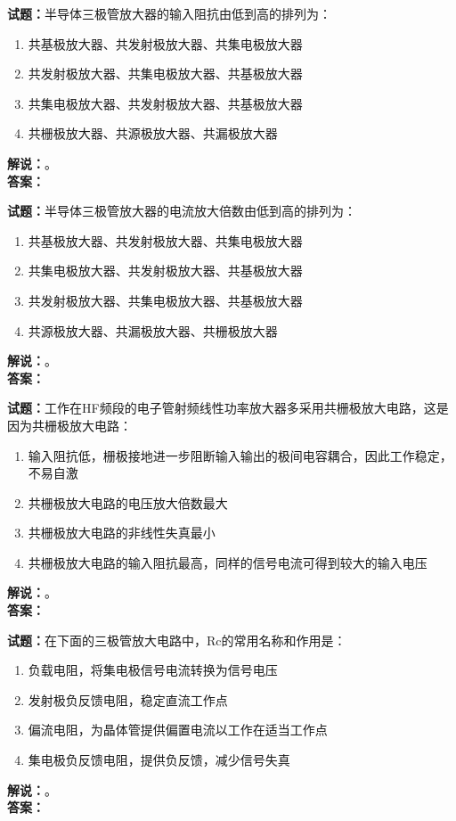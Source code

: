 \documentclass{ctexbook}
\begin{document}
\bigskip




\noindent\textbf{试题：}半导体三极管放大器的输入阻抗由低到高的排列为：
\begin{enumerate}[leftmargin=3em]
\item 共基极放大器、共发射极放大器、共集电极放大器
\item 共发射极放大器、共集电极放大器、共基极放大器
\item 共集电极放大器、共发射极放大器、共基极放大器
\item 共栅极放大器、共源极放大器、共漏极放大器
\end{enumerate}
\noindent\textbf{解说：}\textbf{}。\\\noindent\textbf{答案：}

\bigskip




\noindent\textbf{试题：}半导体三极管放大器的电流放大倍数由低到高的排列为：
\begin{enumerate}[leftmargin=3em]
\item 共基极放大器、共发射极放大器、共集电极放大器
\item 共集电极放大器、共发射极放大器、共基极放大器
\item 共发射极放大器、共集电极放大器、共基极放大器
\item 共源极放大器、共漏极放大器、共栅极放大器
\end{enumerate}
\noindent\textbf{解说：}\textbf{}。\\\noindent\textbf{答案：}

\bigskip




\noindent\textbf{试题：}工作在HF频段的电子管射频线性功率放大器多采用共栅极放大电路，这是因为共栅极放大电路：
\begin{enumerate}[leftmargin=3em]
\item 输入阻抗低，栅极接地进一步阻断输入输出的极间电容耦合，因此工作稳定，不易自激
\item 共栅极放大电路的电压放大倍数最大
\item 共栅极放大电路的非线性失真最小
\item 共栅极放大电路的输入阻抗最高，同样的信号电流可得到较大的输入电压
\end{enumerate}
\noindent\textbf{解说：}\textbf{}。\\\noindent\textbf{答案：}

\bigskip




\noindent\textbf{试题：}在下面的三极管放大电路中，Rc的常用名称和作用是：
\begin{enumerate}[leftmargin=3em]
\item 负载电阻，将集电极信号电流转换为信号电压
\item 发射极负反馈电阻，稳定直流工作点
\item 偏流电阻，为晶体管提供偏置电流以工作在适当工作点
\item 集电极负反馈电阻，提供负反馈，减少信号失真
\end{enumerate}
\noindent\textbf{解说：}\textbf{}。\\\noindent\textbf{答案：}
\end{document}
